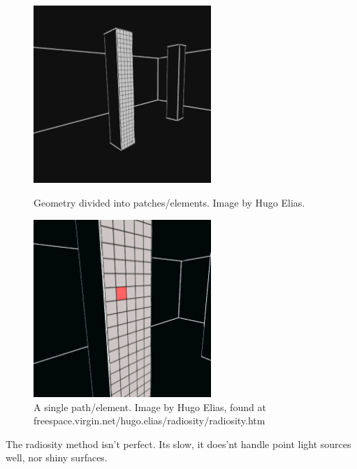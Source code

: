\begin{figure}[ht]
	\begin{minipage}[b]{0.5\linewidth}
		\centering
		\includegraphics[width=0.6\textwidth]{Media/prev_work_radiosity_grid.png}
		\caption{Geometry divided into patches/elements. Image by Hugo Elias.}
		\label{fig:radiosity_grid}
	\end{minipage}
		\hspace{0.5cm}
		\begin{minipage}[b]{0.5\linewidth}
			\centering
		  \includegraphics[width=0.6\textwidth]{Media/prev_work_radiosity_patch.png}
		  \caption{A single path/element. Image by Hugo Elias, found at freespace.virgin.net/hugo.elias/radiosity/radiosity.htm }
		  \label{fig:radiosity_patch}
		\end{minipage}
\end{figure}	

	The radiosity method isn't perfect. Its slow, it does'nt handle point light sources well, nor shiny surfaces.

